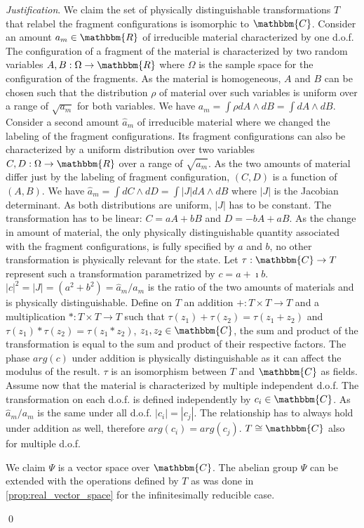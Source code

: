 \documentclass[aps,pra,10pt,twocolumn,floatfix,nofootinbib]{revtex4-1}
\numberwithin{equation}{section}
\theoremstyle{definition}
\newenvironment{justification}{\emph{Justification}.}{\qed}
\begin{document}
\begin{justification}
	We claim the set of physically distinguishable transformations $T$ that relabel the fragment configurations is isomorphic to $\mathbbm{C}$. Consider an amount $a_m \in \mathbbm{R}$ of irreducible material characterized by one d.o.f. The configuration of a fragment of the material is characterized by two random variables $A, B: \Omega \rightarrow \mathbbm{R}$ where $\Omega$ is the sample space for the configuration of the fragments. As the material is homogeneous, $A$ and $B$ can be chosen such that the distribution $\rho$ of material over such variables is uniform over a range of $\sqrt{a_m}$ for both variables. We have $a_m=\int \rho dA \wedge dB = \int dA \wedge dB$. Consider a second amount $\hat{a}_m$ of irreducible material where we changed the labeling of the fragment configurations. Its fragment configurations can also be characterized by a uniform distribution over two variables $C, D: \Omega \rightarrow \mathbbm{R}$ over a range of $\sqrt{\hat{a}_m}$. As the two amounts of material differ just by the labeling of fragment configuration, $(C,D)$ is a function of $(A,B)$. We have $\hat{a}_m = \int dC \wedge dD = \int |J| dA \wedge dB$ where $|J|$ is the Jacobian determinant. As both distributions are uniform, $|J|$ has to be constant. The transformation has to be linear: $C=aA + bB$ and $D=-bA + aB$. As the change in amount of material, the only physically distinguishable quantity associated with the fragment configurations, is fully specified by $a$ and $b$, no other transformation is physically relevant for the state. Let $\tau: \mathbbm{C} \rightarrow T$ represent such a transformation parametrized by $c=a+\imath b$. $|c|^2 = |J| = (a^2 + b^2) = \hat{a}_m / a_m$ is the ratio of the two amounts of materials and is physically distinguishable. Define on $T$ an addition $+: T \times T \rightarrow T$ and a multiplication $*: T \times T \rightarrow T$ such that $\tau(z_1) + \tau(z_2) = \tau(z_1+z_2)$ and $\tau(z_1) * \tau(z_2) = \tau(z_1*z_2)$, $z_1,z_2 \in \mathbbm{C}$, the sum and product of the transformation is equal to the sum and product of their respective factors. The phase $arg(c)$ under addition is physically distinguishable as it can affect the modulus of the result. $\tau$ is an isomorphism between $T$ and $\mathbbm{C}$ as fields. Assume now that the material is characterized by multiple independent d.o.f. The transformation on each d.o.f. is defined independently by $c_i \in \mathbbm{C}$. As $\hat{a}_m / a_m$ is the same under all d.o.f. $|c_i|=|c_j|$. The relationship has to always hold under addition as well, therefore $arg(c_i) = arg(c_j)$. $T\cong \mathbbm{C}$ also for multiple d.o.f.

	We claim $\Psi$ is a vector space over $\mathbbm{C}$. The abelian group $\Psi$ can be extended with the operations defined by $T$ as was done in \ref{prop:real_vector_space} for the infinitesimally reducible case.
	
\end{justification}
\end{document}
